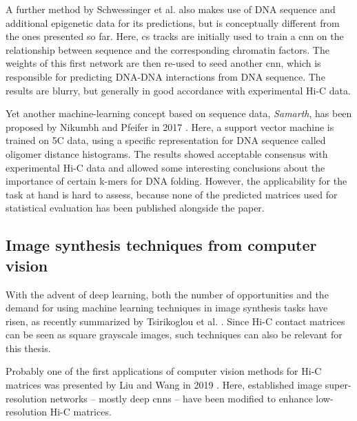 A further method by Schwessinger et al. \cite{Schwessinger2019} also makes use of DNA sequence and additional epigenetic data for its predictions,
but is conceptually different from the ones presented so far.
Here, \acrshort{cs} tracks are initially used to train a \acrshort{cnn} on the relationship between sequence and 
the corresponding chromatin factors. The weights of this first network are then re-used to seed another \acrlong{cnn},
which is responsible for predicting DNA-DNA interactions from DNA sequence.
The results are blurry, but generally in good accordance with experimental Hi-C data.

Yet another machine-learning concept based on sequence data, \emph{Samarth}, has been proposed by Nikumbh and Pfeifer in 2017 \cite{Nikumbh2017}.
Here, a support vector machine is trained on 5C data, using a specific representation for DNA sequence called oligomer distance histograms.
The results showed acceptable consensus with experimental Hi-C data and allowed some interesting conclusions
about the importance of certain k-mers for DNA folding. However, the applicability for the task at hand is hard to assess, 
because none of the predicted matrices used for statistical evaluation has been published alongside the paper.


\subsection{Image synthesis techniques from computer vision} \label{sec:prior:generativeCV}
With the advent of deep learning, both the number of opportunities and the demand for using machine learning techniques 
in image synthesis tasks have risen, as recently summarized by Tsirikoglou et al. \cite{Tsirikoglou2020}.
Since Hi-C contact matrices can be seen as square grayscale images, such techniques can also be relevant for this thesis.

Probably one of the first applications of computer vision methods for Hi-C matrices was presented by Liu and Wang in 2019 \cite{Liu2019b}.
Here, established image super-resolution networks -- mostly deep \acrlong{cnn}s -- have been modified to enhance low-resolution Hi-C matrices.

